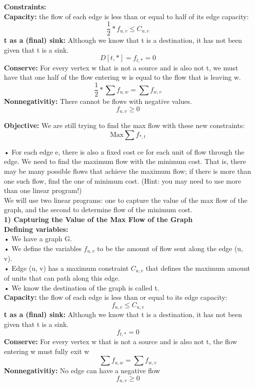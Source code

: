 \documentclass[11pt, solution, letterpaper]{format}
\begin{document}
\textbf{Constraints:}\\
\textbf{Capacity:} the flow of each edge is less than or equal to half of its edge capacity:
$$\frac{1}{2}*f_{u, v} \leq C_{u,v}$$
\textbf{t as a (final) sink:} Although we know that t is a destination, it has not been given that t is a sink.
$$D[t, *] = f_{t,*} = 0$$
\textbf{Conserve:}  For every vertex w that is not a source and is also not t, we must have that one half of the flow entering w is equal to the flow that is leaving w.
$$\frac{1}{2}*\sum f_{u, w} = \sum f_{w, v}$$
\textbf{Nonnegativitiy:} There cannot be flows with negative values.
$$f_{u,v} \geq 0$$

\textbf{Objective:} We are still trying to find the max flow with these new constraints:
$$\text{Max} \sum f_{*, t}$$
\clearpage

• For each edge e, there is also a fixed cost ce for each unit of flow through the edge. We need to find
the maximum flow with the minimum cost. That is, there may be many possible flows that achieve the
maximum flow; if there is more than one such flow, find the one of minimum cost. (Hint: you may need
to use more than one linear program!)\\

We will use two linear programs: one to capture the value of the max flow of the graph, and the second to determine flow of the minimum cost.\\

\textbf{1) Capturing the Value of the Max Flow of the Graph}\\
\textbf{Defining variables:}\\
• We have a graph G.\\
• We define the variables $f_{u, v}$ to be the amount of flow sent along the edge (u, v).\\
• Edge (u, v)  has a maximum constraint $C_{u, v}$ that defines the maximum amount of units that can path along this edge. \\
• We know the destination of the graph is called t.
\\
\textbf{Capacity:} the flow of each edge is less than or equal to its edge capacity:
$$f_{u, v} \leq C_{u,v}$$
\textbf{t as a (final) sink:} Although we know that t is a destination, it has not been given that t is a sink.
$$f_{t, *} = 0$$
\textbf{Conserve:}  For every vertex w that is not a source and is also not t, the flow entering w must fully exit w
$$\sum f_{u, w} = \sum f_{w, v}$$
\textbf{Nonnegativitiy:} No edge can have a negative flow
$$f_{u,v} \geq 0$$
\end{document}
